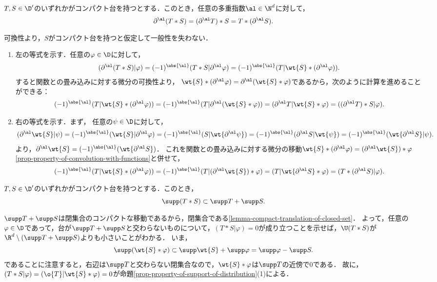 \documentclass[uplatex,dvipdfmx]{jsreport}
\begin{document}
\begin{proposition}[微分との可換性]
    $T,S\in\D'$のいずれかがコンパクト台を持つとする．このとき，任意の多重指数$\al\in\N^d$に対して，
    \[\partial^\al(T*S)=(\partial^\al T)*S=T*(\partial^\al S).\]
\end{proposition}
\begin{Proof}
    可換性より，$S$がコンパクト台を持つと仮定して一般性を失わない．
    \begin{enumerate}[{Step}1]
        \item 左の等式を示す．任意の$\varphi\in\D$に対して，
        \[(\partial^\al(T*S)|\varphi)=(-1)^{\abs{\al}}(T*S|\partial^\al\varphi)=(-1)^{\abs{\al}}(T|\wt{S}*(\partial^\al\varphi)).\]
        すると関数との畳み込みに対する微分の可換性より，
        $\wt{S}*(\partial^\al\varphi)=\partial^\al(\wt{S}*\varphi)$であるから，次のように計算を進めることができる：
        \[(-1)^{\abs{\al}}(T|\wt{S}*(\partial^\al\varphi))=(-1)^{\abs{\al}}(T|\partial^\al(\wt{S}*\varphi))=(\partial^\al T|\wt{S}*\varphi)=((\partial^\al T)*S|\varphi).\]
        \item 右の等式を示す．まず，
        任意の$\psi\in\D$に対して，
        \[(\partial^\al\wt{S}|\psi)=(-1)^{\abs{\al}}(\wt{S}|\partial^\al\varphi)=(-1)^{\abs{\al}}(S|\wt{\partial^\al\psi})=(-1)^{\abs{\al}}(\partial^\al S|\wt{\psi})=(-1)^{\abs{\al}}(\wt{\partial^\al S}|\psi).\]
        より，$\partial^\al\wt{S}=(-1)^{\abs{\al}}(\wt{\partial^\al S})$．
        これを関数との畳み込みに対する微分の移動$\wt{S}*(\partial^\al\varphi)=(\partial^\al\wt{S})*\varphi$\ref{prop-property-of-convolution-with-functions}と併せて，
        \[(-1)^{\abs{\al}}(T|\wt{S}*(\partial^\al\varphi))=(-1)^{\abs{\al}}(T|(\partial^\al\wt{S})*\varphi)=(T|\wt{\partial^\al S}*\varphi)=(T*(\partial^\al S)|\varphi).\]
    \end{enumerate}
\end{Proof}

\begin{proposition}[台の演算]
    $T,S\in\D'$のいずれかがコンパクト台を持つとする．このとき，
    \[\supp(T*S)\subset\supp T+\supp S.\]
\end{proposition}
\begin{Proof}
    $\supp T+\supp S$は閉集合のコンパクトな移動であるから，閉集合である\ref{lemma-compact-translation-of-closed-set}．
    よって，任意の$\varphi\in\D$であって，台が$\supp T+\supp S$と交わらないものについて，$(T*S|\varphi)=0$が成り立つことを示せば，$\U(T*S)$が$\R^d\setminus(\supp T+\supp S)$よりも小さいことがわかる．
    いま，
    \[\supp(\wt{S}*\varphi)\subset\supp\wt{S}+\supp\varphi=\supp\varphi-\supp S.\]
    であることに注意すると，右辺は$\supp T$と交わらない閉集合なので，$\wt{S}*\varphi$は$\supp T$の近傍で$0$である．
    故に，$(T*S|\varphi)=(\o{T}|\wt{S}*\varphi)=0$が命題\ref{prop-property-of-support-of-distribution}(1)による．
\end{Proof}
\end{document}

